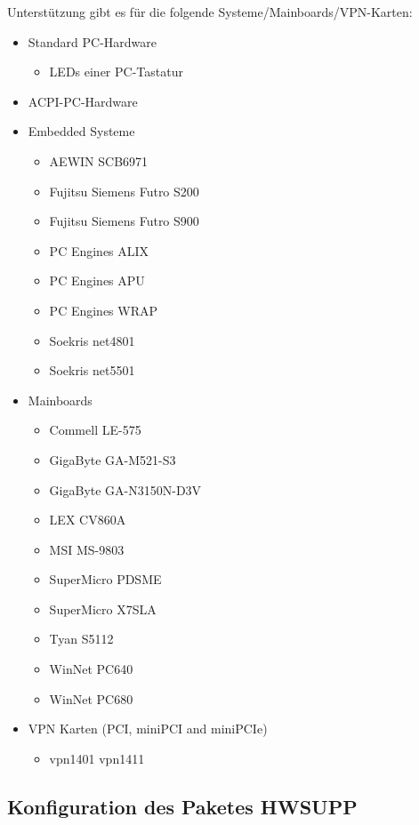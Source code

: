 Unterstützung gibt es für die folgende Systeme/Mainboards/VPN-Karten:
\begin{itemize}
  \item Standard PC-Hardware
  \begin{itemize}
    \item LEDs einer PC-Tastatur
  \end{itemize}
  \item ACPI-PC-Hardware
  \item Embedded Systeme
  \begin{itemize}
    \item AEWIN SCB6971
    \item Fujitsu Siemens Futro S200
    \item Fujitsu Siemens Futro S900
    \item PC Engines ALIX
    \item PC Engines APU
    \item PC Engines WRAP
    \item Soekris net4801
    \item Soekris net5501
  \end{itemize}
  \item Mainboards
  \begin{itemize}
    \item Commell LE-575
    \item GigaByte GA-M521-S3
    \item GigaByte GA-N3150N-D3V
    \item LEX CV860A
    \item MSI MS-9803
    \item SuperMicro PDSME
    \item SuperMicro X7SLA
    \item Tyan S5112
    \item WinNet PC640
    \item WinNet PC680
  \end{itemize}
    \item VPN Karten (PCI, miniPCI and miniPCIe)
  \begin{itemize}
    \item vpn1401 vpn1411
  \end{itemize}
\end{itemize}


\subsection {Konfiguration des Paketes HWSUPP}
  
